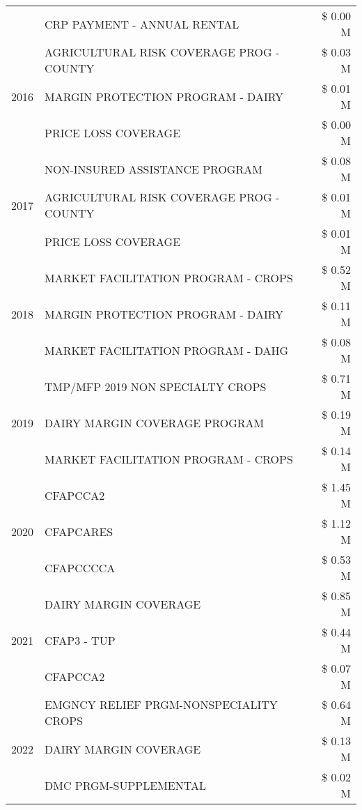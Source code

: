 \begin{tabular}{llr}
 & CRP PAYMENT - ANNUAL RENTAL & \$ 0.00 M \\
\cline{1-3}
\multirow[t]{3}{*}{2016} & AGRICULTURAL RISK COVERAGE PROG - COUNTY & \$ 0.03 M \\
 & MARGIN PROTECTION PROGRAM - DAIRY & \$ 0.01 M \\
 & PRICE LOSS COVERAGE & \$ 0.00 M \\
\cline{1-3}
\multirow[t]{3}{*}{2017} & NON-INSURED ASSISTANCE PROGRAM & \$ 0.08 M \\
 & AGRICULTURAL RISK COVERAGE PROG - COUNTY & \$ 0.01 M \\
 & PRICE LOSS COVERAGE & \$ 0.01 M \\
\cline{1-3}
\multirow[t]{3}{*}{2018} & MARKET FACILITATION PROGRAM - CROPS & \$ 0.52 M \\
 & MARGIN PROTECTION PROGRAM - DAIRY & \$ 0.11 M \\
 & MARKET FACILITATION PROGRAM - DAHG & \$ 0.08 M \\
\cline{1-3}
\multirow[t]{3}{*}{2019} & TMP/MFP 2019 NON SPECIALTY CROPS & \$ 0.71 M \\
 & DAIRY MARGIN COVERAGE PROGRAM & \$ 0.19 M \\
 & MARKET FACILITATION PROGRAM - CROPS & \$ 0.14 M \\
\cline{1-3}
\multirow[t]{3}{*}{2020} & CFAPCCA2 & \$ 1.45 M \\
 & CFAPCARES & \$ 1.12 M \\
 & CFAPCCCCA & \$ 0.53 M \\
\cline{1-3}
\multirow[t]{3}{*}{2021} & DAIRY MARGIN COVERAGE & \$ 0.85 M \\
 & CFAP3 - TUP & \$ 0.44 M \\
 & CFAPCCA2 & \$ 0.07 M \\
\cline{1-3}
\multirow[t]{3}{*}{2022} & EMGNCY RELIEF PRGM-NONSPECIALITY CROPS & \$ 0.64 M \\
 & DAIRY MARGIN COVERAGE & \$ 0.13 M \\
 & DMC PRGM-SUPPLEMENTAL & \$ 0.02 M \\
\cline{1-3}
\bottomrule
\end{tabular}
